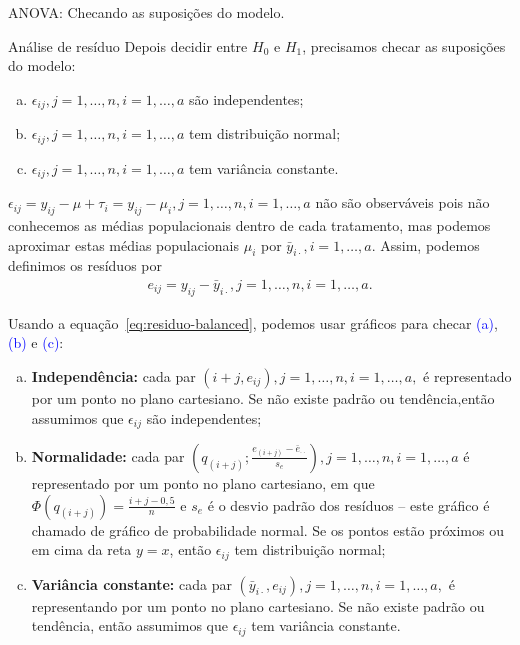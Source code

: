 \documentclass[8pt]{beamer}
\begin{document}
\begin{frame}{ANOVA: Checando as suposições do modelo.}

\small
\begin{block}{Análise de resíduo}
	Depois decidir entre $H_0$ e $H_1$, precisamos checar as suposições do modelo:
	\begin{enumerate}[(a)]
		\item $\epsilon_{ij}, j=1, \dots, n, i=1, \dots, a$ são independentes;
		\item $\epsilon_{ij}, j=1, \dots, n, i=1, \dots, a$ tem distribuição normal;
		\item  $\epsilon_{ij}, j=1, \dots, n, i=1, \dots, a$ tem variância constante.
	\end{enumerate} 
	
	$\epsilon_{ij} = y_{ij} - \mu + \tau_i  = y_{ij} - \mu_i, j=1, \dots, n, i=1, \dots, a$ não são observáveis pois não conhecemos as médias populacionais dentro de cada tratamento, mas podemos aproximar estas médias populacionais $\mu_i$ por  $\bar{y}_{i\cdot}, i=1, \dots, a$. Assim, podemos definimos os resíduos por
	\begin{align}\label{eq:residuo-balanced}
	e_{ij} = y_{ij} - \bar{y}_{i\cdot}, j=1, \dots, n, i=1, \dots, a.
	\end{align}
	
	Usando a equação~\eqref{eq:residuo-balanced}, podemos usar gráficos para checar \textcolor{blue}{(a)}, \textcolor{blue}{(b)} e \textcolor{blue}{(c)}:
	\begin{enumerate}[(a)]
		\item \textbf{Independência:} cada par $(i+j, e_{ij}), j=1, \dots, n, i=1, \dots, a,$ é representado por um ponto no plano cartesiano. Se não existe padrão ou tendência,então assumimos que $\epsilon_{ij}$ são independentes;
		\item \textbf{Normalidade:} cada par $\left( q_{(i+j)}; \frac{e_{(i+j)} - \bar{e}_{\cdot\cdot}}{s_e}  \right)$$, j=1, \dots, n, i=1, \dots, a$ é representado por um ponto no plano cartesiano, em que $\Phi(q_{(i+j)}) = \frac{i+j-0,5}{n}$ e $s_e$ é o desvio padrão dos resíduos -- este gráfico é chamado de gráfico de probabilidade normal. Se os pontos estão próximos ou em cima da reta $y=x$, então $\epsilon_{ij}$ tem distribuição normal;
		\item \textbf{Variância constante:} cada par $\left(  \bar{y}_{i\cdot}, e_{ij} \right), j=1, \dots, n, i=1, \dots, a,$ é representando por um ponto no plano cartesiano. Se não existe padrão ou tendência, então assumimos que $\epsilon_{ij}$ tem variância constante.
	\end{enumerate}
\end{block}
\normalsize

\end{frame}
\end{document}
